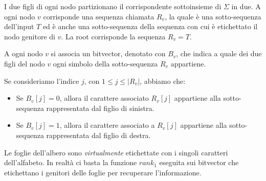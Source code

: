 I due figli di ogni nodo partizionano il corrispondente sottoinsieme di $\Sigma$
in due. A ogni nodo $v$ corrisponde una sequenza chiamata $R_v$, la quale è una
sotto-sequenza dell'input $T$ ed è anche una sotto-sequenza della sequenza con
cui è etichettato il nodo genitore di $v$. La root corrisponde la sequenza $R_v = T$.

A ogni nodo $v$ si associa un bitvector, denotato con $B_v$, che indica a quale
dei due figli del nodo $v$ ogni simbolo della sotto-sequenza $R_v$ appartiene.

Se consideriamo l'indice $j$, con $1 \leq j \leq |R_v|$, abbiamo che:
\begin{itemize}
    \item Se $B_v [j] = 0$, allora il carattere associato $R_v [j]$ appartiene
          alla sotto-sequenza rappresentata dal figlio di sinistra.
    \item Se $B_v [j] = 1$, allora il carattere associato a $R_v [j]$ appartiene
          alla sotto-sequenza rappresentata dal figlio di destra.
\end{itemize}
Le foglie dell'albero sono \textit{virtualmente} etichettate con i singoli
caratteri dell'alfabeto. In realtà ci basta la funzione $rank_1$ eseguita sui
bitvector che etichettano i genitori delle foglie per recuperare l'informazione.
